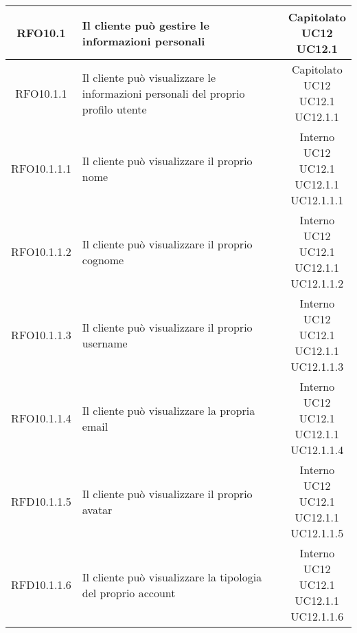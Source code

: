 \begin{longtable}{|c|p{8cm}|c|}
\hypertarget{RFO10.1}{RFO10.1} & Il cliente può gestire le informazioni personali & \makecell*{Capitolato\\UC12\\UC12.1} \\
\hline

\hypertarget{RFO10.1.1}{RFO10.1.1} & Il cliente può visualizzare le informazioni personali del proprio profilo utente &\makecell*{Capitolato\\UC12\\UC12.1\\UC12.1.1} \\
\hline

\hypertarget{RFO10.1.1.1}{RFO10.1.1.1} & Il cliente può visualizzare il proprio nome & \makecell*{Interno\\UC12\\UC12.1\\UC12.1.1\\UC12.1.1.1} \\
\hline
\hypertarget{RFO10.1.1.2}{RFO10.1.1.2} & Il cliente può visualizzare il proprio cognome & \makecell*{Interno\\UC12\\UC12.1\\UC12.1.1\\UC12.1.1.2} \\
\hline
\hypertarget{RFO10.1.1.3}{RFO10.1.1.3} & Il cliente può visualizzare il proprio username & \makecell*{Interno\\UC12\\UC12.1\\UC12.1.1\\UC12.1.1.3} \\
\hline
\hypertarget{RFO10.1.1.4}{RFO10.1.1.4} & Il cliente può visualizzare la propria email & \makecell*{Interno\\UC12\\UC12.1\\UC12.1.1\\UC12.1.1.4} \\
\hline
\hypertarget{RFD10.1.1.5}{RFD10.1.1.5} & Il cliente può visualizzare il proprio avatar & \makecell*{Interno\\UC12\\UC12.1\\UC12.1.1\\UC12.1.1.5} \\
\hline
\hypertarget{RFD10.1.1.6}{RFD10.1.1.6} & Il cliente può visualizzare la tipologia del proprio account & \makecell*{Interno\\UC12\\UC12.1\\UC12.1.1\\UC12.1.1.6} \\
\hline


\end{longtable}
